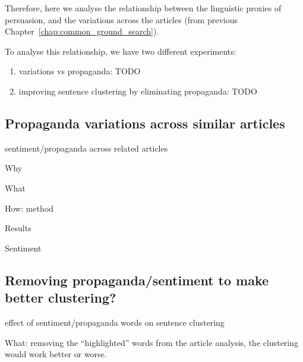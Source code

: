 Therefore, here we analyse the relationship between the linguistic proxies of persuasion, and the variations across the articles (from previous Chapter~\ref{chap:common_ground_search}).

To analyse this relationship, we have two different experiments:

\begin{enumerate}
    \item variations vs propaganda: TODO
    \item improving sentence clustering by eliminating propaganda: TODO
\end{enumerate}

\subsection{\statusred Propaganda variations across similar articles}

sentiment/propaganda across related articles

Why

What

How: method

Results


Sentiment


\subsection{\statusorange Removing propaganda/sentiment to make better clustering?}

effect of sentiment/propaganda words on sentence clustering

What: removing the “highlighted” words from the article analysis, the clustering would work better or worse.

